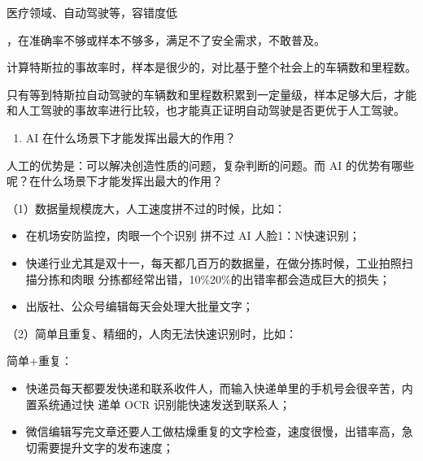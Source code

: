 \documentclass[letterpaper,10pt,english]{sphinxmanual}
\begin{document}
医疗领域、自动驾驶等，容错度低%
\begin{footnote}[232]\sphinxAtStartFootnote
{}
%
\end{footnote}，在准确率不够或样本不够多，满足不了安全需求，不敢普及。

计算特斯拉的事故率时，样本是很少的，对比基于整个社会上的车辆数和里程数。

只有等到特斯拉自动驾驶的车辆数和里程数积累到一定量级，样本足够大后，才能和人工驾驶的事故率进行比较，也才能真正证明自动驾驶是否更优于人工驾驶。
\begin{enumerate}
%
\setcounter{enumi}{2}
\item {} 
AI
在什么场景下才能发挥出最大的作用？%
\begin{footnote}[233]\sphinxAtStartFootnote
{}
%
\end{footnote}

\end{enumerate}

人工的优势是：可以解决创造性质的问题，复杂判断的问题。而 AI
的优势有哪些呢？在什么场景下才能发挥出最大的作用？

（1）数据量规模庞大，人工速度拼不过的时候，比如：
\begin{itemize}
\item {} 
在机场安防监控，肉眼一个个识别 拼不过 AI 人脸1：N快速识别；

\item {} 
快递行业尤其是双十一，每天都几百万的数据量，在做分拣时候，工业拍照扫描分拣和肉眼\sphinxhyphen{}
分拣都经常出错，10\%\sphinxhyphen{}20\%的出错率都会造成巨大的损失；

\item {} 
出版社、公众号编辑每天会处理大批量文字；

\end{itemize}

（2）简单且重复、精细的，人肉无法快速识别时，比如：

简单+重复：
\begin{itemize}
\item {} 
快递员每天都要发快递和联系收件人，而输入快递单里的手机号会很辛苦，内置系统通过快\sphinxhyphen{}
递单 OCR 识别能快速发送到联系人；

\item {} 
微信编辑写完文章还要人工做枯燥重复的文字检查，速度很慢，出错率高，急切需要提升文字的发布速度；

\end{itemize}
\end{document}
